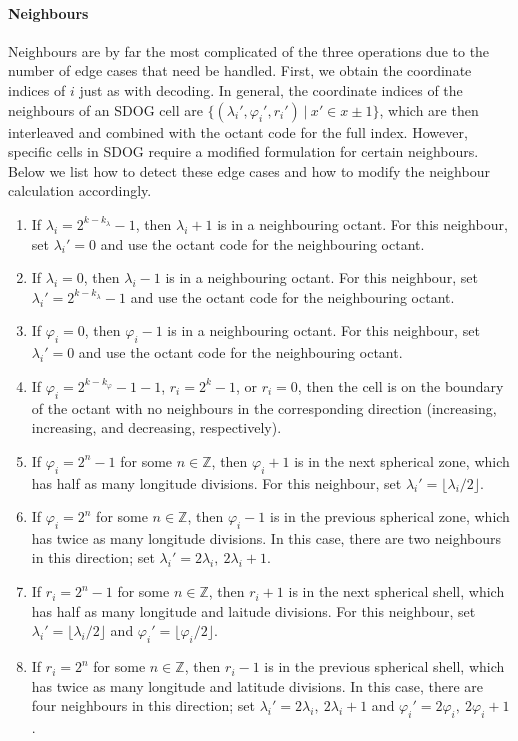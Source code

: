 \paragraph{Neighbours}
Neighbours are by far the most complicated of the three operations due to the number of edge cases that need be handled.
First, we obtain the coordinate indices of $i$ just as with decoding.
In general, the coordinate indices of the neighbours of an SDOG cell are $\{ (\lambda_i', \varphi_i', r_i') \ | \ x' \in x \pm 1 \}$, which are then interleaved and combined with the octant code for the full index.
However, specific cells in SDOG require a modified formulation for certain neighbours.
Below we list how to detect these edge cases and how to modify the neighbour calculation accordingly.
%
\begin{enumerate}
	\item If $\lambda_i = 2^{k - k_\lambda} - 1$, then $\lambda_i + 1$ is in a neighbouring octant.
	For this neighbour, set $\lambda_i' = 0$ and use the octant code for the neighbouring octant.
	\item If $\lambda_i = 0$, then $\lambda_i - 1$ is in a neighbouring octant.
	For this neighbour, set $\lambda_i' = 2^{k - k_\lambda} - 1$ and use the octant code for the neighbouring octant.
	\item If $\varphi_i = 0$, then $\varphi_i - 1$ is in a neighbouring octant.
	For this neighbour, set $\lambda_i' = 0$ and use the octant code for the neighbouring octant.
	\item If $\varphi_i = 2^{k - k_\varphi} - 1 - 1$, $r_i = 2^k - 1$, or $r_i = 0$, then the cell is on the boundary of the octant with no neighbours in the corresponding direction (increasing, increasing, and decreasing, respectively).
	\item If $\varphi_i = 2^n - 1$ for some $n \in \mathbb{Z}$, then $\varphi_i + 1$ is in the next spherical zone, which has half as many longitude divisions.
	For this neighbour, set $\lambda_i' = \lfloor \lambda_i / 2 \rfloor$.
	\item If $\varphi_i = 2^n$ for some $n \in \mathbb{Z}$, then $\varphi_i - 1$ is in the previous spherical zone, which has twice as many longitude divisions.
	In this case, there are two neighbours in this direction; set $\lambda_i' = 2 \lambda_i, \  2 \lambda_i + 1$.
	\item If $r_i = 2^n - 1$ for some $n \in \mathbb{Z}$, then $r_i + 1$ is in the next spherical shell, which has half as many longitude and laitude divisions.
	For this neighbour, set $\lambda_i' = \lfloor \lambda_i / 2 \rfloor$ and $\varphi_i' = \lfloor \varphi_i / 2 \rfloor$.
	\item If $r_i = 2^n$ for some $n \in \mathbb{Z}$, then $r_i - 1$ is in the previous spherical shell, which has twice as many longitude and latitude divisions.
	In this case, there are four neighbours in this direction; set $\lambda_i' = 2 \lambda_i, \  2 \lambda_i + 1$ and $\varphi_i' = 2 \varphi_i, \  2 \varphi_i + 1$.
\end{enumerate}
%


